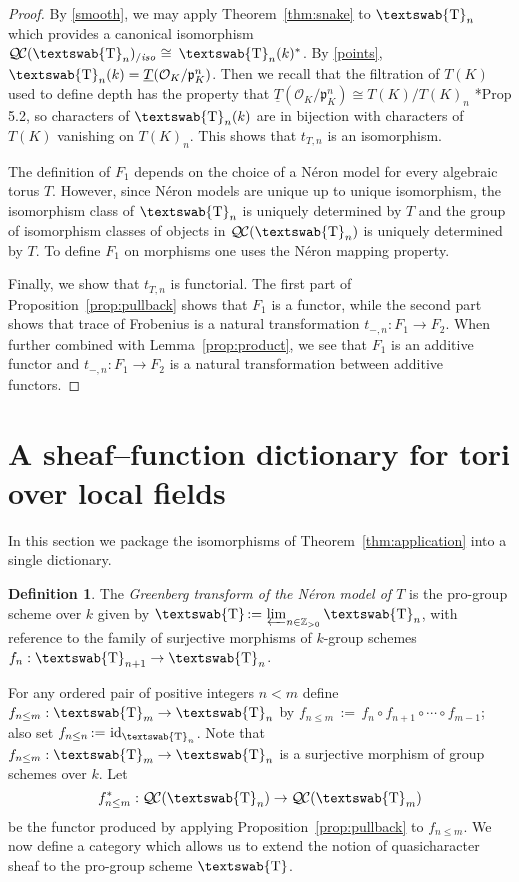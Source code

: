 \documentclass[11pt]{amsart}
\newcommand{\mathswab}[1]{\operatorname{\textswab{#1}}}
\theoremstyle{plain}
\theoremstyle{definition}
\newtheorem{definition}[theorem]{Definition}
\theoremstyle{remark}
\newcommand{\ZZ}{{\mathbb{Z}}}
\newcommand{\OK}{\mathcal{O}_K}
\newcommand{\pK}{\mathfrak{p}_K}
\newcommand{\Fq}{k}
\DeclareMathOperator{\id}{id}
\newcommand{\cdef}[1]{{#1}\index{#1}}
\newcommand{\ceq}{{\, :=\, }}
\newcommand{\iso}{{\ \cong\ }}
\newcommand{\GN}[1]{\mathswab{#1}}
\newcommand{\TT}{\underline{T}}
\newcommand{\QC}{{\mathcal{Q\hskip-0.8pt C}}}
\newcommand{\QCiso}[1]{\QC(#1)_{/\textit{iso}}}
\newcommand{\trFrob}[1]{t_{#1}}
\begin{document}
\begin{proof}
  By \ref{smooth}, we may apply Theorem~\ref{thm:snake} to
  $\GN{T}_n$ which provides a canonical isomorphism
  $\QCiso{\GN{T}_n} \iso \GN{T}_n(\Fq)^*$.
  By \ref{points}, $\GN{T}_n(\Fq) = \TT(\OK/\pK^n)$.
  Then we recall that the filtration of $T(K)$ used to
  define depth has the property that $\TT(\OK/\pK^n) \cong T(K) / T(K)_n$
  \cite{yu:03a}*{Prop 5.2}, so characters of $\GN{T}_n(\Fq)$ 
  are in bijection with characters of $T(K)$ vanishing on $T(K)_n$. 
  This shows that $\trFrob{T,n}$ is an isomorphism.

  The definition of $F_1$ depends 
  on the choice of a Néron model for every algebraic torus $T$.
  However, since Néron models are unique up to unique isomorphism,
  the isomorphism class of $\GN{T}_n$ is uniquely determined by $T$
  and the group of isomorphism classes of objects in $\QC(\GN{T}_n)$ 
  is uniquely determined by $T$. 
  To define $F_1$ on morphisms one uses the Néron mapping property.
  
  Finally, we show that $\trFrob{T,n}$ is functorial.
The first part of Proposition~\ref{prop:pullback} shows that $F_1$ is a functor,
while the second part shows that trace of Frobenius is a natural transformation
$t_{ - ,n} : F_1 \to F_2$. When further combined with Lemma~\ref{prop:product},
we see that $F_1$ is an additive functor and $t_{ - ,n}: F_1 \to F_2$ is a
natural transformation between additive functors.
\end{proof}


\section{A sheaf--function dictionary for tori over local fields} \label{sec:quasichar} 

In this section we package the isomorphisms of Theorem~\ref{thm:application} into
a single dictionary.

\begin{definition}\label{def:objGN}
The \emph{Greenberg transform of the N\'eron model of $T$} 
is the pro-group scheme over $\Fq$ given by 
$\cdef{\GN{T}} \ceq \varprojlim_{n\in \ZZ_{>0}} \GN{T}_{n}$, 
with reference to the family of  surjective morphisms of 
$\Fq$-group schemes $f_n : \GN{T}_{n+1} \to \GN{T}_n$.
\end{definition}

For any  ordered pair of positive integers $n< m$ define 
$f_{n\leq m} : \GN{T}_{m} \to \GN{T}_{n}$ 
by $f_{n\leq m}\ceq f_n \circ f_{n+1} \circ \cdots \circ f_{m-1}$; 
also set $f_{n\leq n} \ceq \id_{\GN{T}_n}$.
Note that $f_{n\leq m}:  \GN{T}_{m} \to \GN{T}_{n}$ is a surjective morphism 
of group schemes over $\Fq$.
Let 
\[
f_{n\leq m}^* : \QC(\GN{T}_n) \to \QC(\GN{T}_{m})
\]
be the functor produced by applying Proposition~\ref{prop:pullback} to $f_{n\leq m}$.
We now define a category which allows us to extend the notion 
of quasicharacter sheaf to the pro-group scheme $\GN{T}$. 
\end{document}

